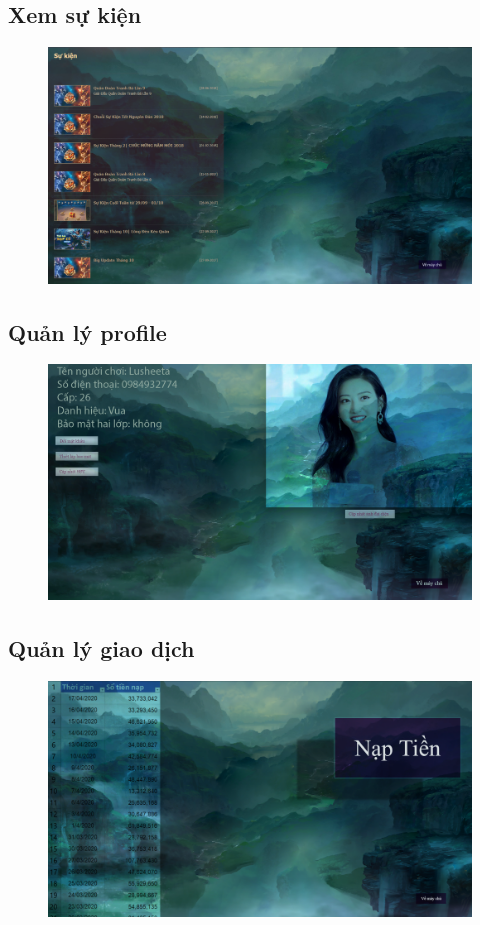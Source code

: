 \documentclass[3p]{elsarticle}
\begin{document}
\subsection{Xem sự kiện}
\begin{figure}[!htbp]
	\centering
	\includegraphics[scale=.3]{images/view_event.pdf}
\end{figure}
\newpage
\subsection{Quản lý profile}
\begin{figure}[!htbp]
	\centering
	\includegraphics[scale=.3]{images/profile_management.pdf}
\end{figure}
\subsection{Quản lý giao dịch}
\begin{figure}[!htbp]
	\centering
	\includegraphics[scale=.3]{images/transaction_management.pdf}
\end{figure}
\newpage
\end{document}
